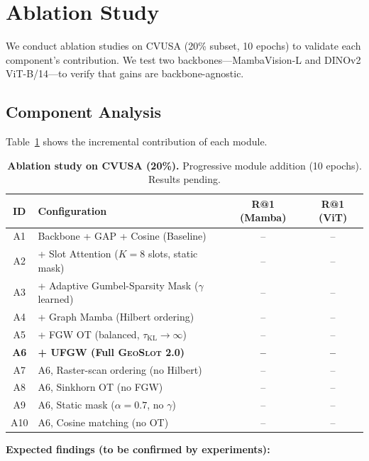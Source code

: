 \documentclass{article}
\newcommand{\oursv}{\textsc{GeoSlot 2.0}}
\begin{document}
\section{Ablation Study}\label{sec:ablation}

We conduct ablation studies on CVUSA (20\% subset, 10 epochs) to validate each component's contribution. We test two backbones---MambaVision-L and DINOv2 ViT-B/14---to verify that gains are backbone-agnostic.

\subsection{Component Analysis}

Table~\ref{tab:ablation} shows the incremental contribution of each module.

\begin{table}[h]
\centering
\caption{\textbf{Ablation study on CVUSA (20\%).} Progressive module addition (10 epochs). Results pending.}
\label{tab:ablation}
\begin{tabular}{clcc}
\toprule
ID & Configuration & R@1 (Mamba) & R@1 (ViT) \\
\midrule
A1 & Backbone + GAP + Cosine (Baseline) & -- & -- \\
A2 & + Slot Attention ($K{=}8$ slots, static mask) & -- & -- \\
A3 & + Adaptive Gumbel-Sparsity Mask ($\gamma$ learned) & -- & -- \\
A4 & + Graph Mamba (Hilbert ordering) & -- & -- \\
A5 & + FGW OT (balanced, $\tau_{\text{KL}}{\to}\infty$) & -- & -- \\
\textbf{A6} & \textbf{+ UFGW (Full \oursv{})} & \textbf{--} & \textbf{--} \\
\midrule
A7 & A6, Raster-scan ordering (no Hilbert) & -- & -- \\
A8 & A6, Sinkhorn OT (no FGW) & -- & -- \\
A9 & A6, Static mask ($\alpha{=}0.7$, no $\gamma$) & -- & -- \\
A10 & A6, Cosine matching (no OT) & -- & -- \\
\bottomrule
\end{tabular}
\end{table}

\textbf{Expected findings (to be confirmed by experiments):}
\end{document}
